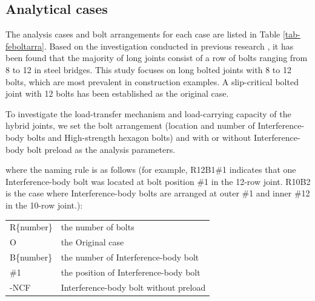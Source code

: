 \subsection{Analytical cases}
The analysis cases and bolt arrangements for each case are listed in Table \ref{tab-feboltarra}. Based on the investigation conducted in previous research \cite{kameilong}, it has been found that the majority of long joints consist of a row of bolts ranging from 8 to 12 in steel bridges. This study focuses on long bolted joints with 8 to 12 bolts, which are most prevalent in construction examples. A slip-critical bolted joint with 12 bolts has been established as the original case. 

To investigate the load-transfer mechanism and load-carrying capacity of the hybrid joints, we set the bolt arrangement (location and number of Interference-body bolts and High-strength hexagon bolts) and with or without Interference-body bolt preload as the analysis parameters. \par  
where the naming rule is as follows (for example, R12B1\#1 indicates that one Interference-body bolt was located at bolt position \#1 in the 12-row joint. R10B2 is the case where Interference-body bolts are arranged at outer \#1 and inner \#12 in the 10-row joint.):

\begin{tabular}{lp{6cm}}
    R\{number\} &  the number of bolts \\
    O &  the Original case \\
    B\{number\} &  the number of Interference-body bolt \\
    \#1 & the position of Interference-body bolt\\
    -NCF & Interference-body bolt without preload\\
\end{tabular}

